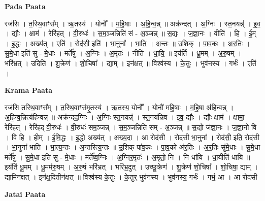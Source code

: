 \documentclass[17pt]{extarticle}
\begin{document}
\textbf{Pada Paata} \newline

रज॑सि । त॒स्थि॒वाꣳस᳚म् । ऋ॒तस्य॑ । योनौ᳚ । म॒हि॒षाः । अ॒हि॒न्व॒न्न् ॥ अक्र॑न्दत् । अ॒ग्निः । स्त॒नयन्न्॑ । इ॒व॒ । द्यौः । क्षाम॑ । रेरि॑हत् । वी॒रुधः॑ । स॒म॒ञ्जन्निति॑ सं - अ॒ञ्जन्न् ॥ स॒द्यः । ज॒ज्ञा॒नः । वीति॑ । हि । ई॒म् । इ॒द्धः । अख्य॑त् । एति॑ । रोद॑सी॒ इति॑ । भा॒नुना᳚ । भा॒ति॒ । अ॒न्तः ॥ उ॒शिक् । पा॒व॒कः । अ॒र॒तिः । सु॒मे॒धा इति॑ सु - मे॒धाः । मर्ते॑षु । अ॒ग्निः । अ॒मृतः॑ । नीति॑ । धा॒यि॒ ॥ इय॑र्ति । धू॒मम् । अ॒रु॒षम् । भरि॑भ्रत् । उदिति॑ । शु॒क्रेण॑ । शो॒चिषा᳚ । द्याम् । इन॑क्षत् ॥ विश्व॑स्य । के॒तुः । भुव॑नस्य । गर्भः॑ । एति॑ ।  \newline


\textbf{Krama Paata} \newline

रज॑सि तस्थि॒वाꣳस᳚म् । त॒स्थि॒वाꣳस॑मृ॒तस्य॑ । ऋ॒तस्य॒ योनौ᳚ । योनौ॑ महि॒षाः । म॒हि॒षा अ॑हिन्वन्न् । अ॒हि॒न्व॒न्नित्य॑हिन्वन्न् ॥ अक्र॑न्दद॒ग्निः । अ॒ग्निः स्त॒नयन्न्॑ । स्त॒नय॑न्निव । इ॒व॒ द्यौः । द्यौः क्षाम॑ । क्षामा॒ रेरि॑हत् । रेरि॑हद् वी॒रुधः॑ । वी॒रुधः॑ सम॒ञ्जन्न् । स॒म॒ञ्जन्निति॑ सम् - अ॒ञ्जन्न् ॥ स॒द्यो ज॑ज्ञा॒नः । ज॒ज्ञा॒नो वि । वि हि । हीम् । ई॒मि॒द्धः । इ॒द्धो अख्य॑त् । अख्य॒दा । आ रोद॑सी । रोद॑सी भा॒नुना᳚ । रोद॑सी॒ इति॒ रोद॑सी । भा॒नुना॑ भाति । भा॒त्य॒न्तः । अ॒न्तरित्य॒न्तः ॥ उ॒शिक् पा॑व॒कः । पा॒व॒को अ॑र॒तिः । अ॒र॒तिः सु॑मे॒धाः । सु॒मे॒धा मर्ते॑षु । सु॒मे॒धा इति॑ सु - मे॒धाः । मर्ते᳚ष्व॒ग्निः । अ॒ग्निर॒मृतः॑ । अ॒मृतो॒ नि । नि धा॑यि । धा॒यीति॑ धायि ॥ इय॑र्ति धू॒मम् । धू॒मम॑रु॒षम् । अ॒रु॒षं भरि॑भ्रत् । भरि॑भ्र॒दुत् । उच्छु॒क्रेण॑ । शु॒क्रेण॑ शो॒चिषा᳚ । शो॒चिषा॒ द्याम् । द्यामिन॑क्षत् । इन॑क्ष॒दितीन॑क्षत् ॥ विश्व॑स्य के॒तुः । के॒तुर् भुव॑नस्य । भुव॑नस्य॒ गर्भः॑ । गर्भ॒ आ । आ रोद॑सी \newline

\textbf{Jatai Paata} \newline
\end{document}
